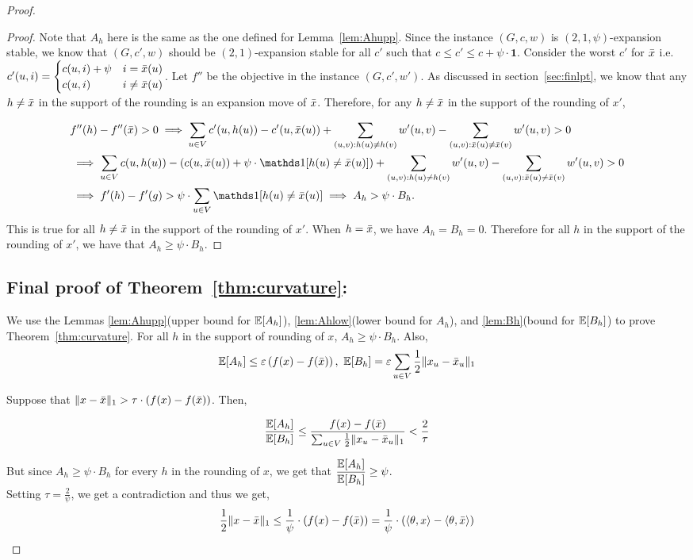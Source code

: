 \begin{proof}
\begin{proof}
Note that $A_h$ here is the same as the one defined for Lemma~\ref{lem:Ahupp}.
Since the instance $(G,c,w)$ is $(2,1,\psi)$-expansion stable, we know that $(G,c',w)$ should be $(2,1)$-expansion stable for all $c'$ such that $c \leq c' \leq c + \psi \cdot \mathbf{1}$. Consider the worst $c'$ for $\bar{x}$ i.e.  $c'(u,i) = \begin{cases}
    c(u,i) + \psi & i = \bar{x}(u)\\
    c(u,i) & i \ne \bar{x}(u)
\end{cases}$. 
Let $f''$ be the objective in the instance $(G,c',w')$. As discussed in section~\ref{sec:finlpt}, we know that any $h \neq \bar{x}$ in the support of the rounding is an expansion move of $\bar{x}$. Therefore, for any $h \neq \bar{x}$ in the support of the rounding of $x'$,

\begin{align*}
    & f''(h) - f''(\bx) > 0 \implies \sum_{u \in V} c'(u,h(u)) - c'(u,\bx(u))  + \sum_{(u,v):h(u)\neq h(v)} w'(u,v) - \sum_{(u,v):\bx(u)\neq \bx(v)} w'(u,v) > 0
    \\&\implies \sum_{u \in V} c(u,h(u)) - \rbr{c(u,\bx(u)) + \psi \cdot \indicator[h(u) \ne \bx(u)] } + \sum_{(u,v):h(u)\neq h(v)} w'(u,v) - \sum_{(u,v):\bx(u)\neq \bx(v)} w'(u,v) > 0
    \\&\implies f'(h) - f'(g) > \psi \cdot \sum_{u \in V} \indicator[h(u) \ne \bx(u)] \implies A_h > \psi \cdot B_h.
\end{align*}
This is true for all $h \neq \bar{x}$ in the support of the rounding of $x'$. When $h = \bar{x}$, we have $A_h = B_h = 0$. Therefore for all $h$ in the support of the rounding of $x'$, we have that $A_h \geq \psi \cdot B_h$.  \end{proof}

\subsection{Final proof of Theorem~\ref{thm:curvature}:}
We use the Lemmas \ref{lem:Ahupp}(upper bound for $\operatorname*{\mathbb{E}}[A_h]$), \ref{lem:Ahlow}(lower bound for $A_h$), and \ref{lem:Bh}(bound for $\operatorname*{\mathbb{E}}[B_h]$) to prove Theorem~\ref{thm:curvature}. For all $h$ in the support of rounding of $x$, $A_h \geq \psi \cdot B_h$. Also, 
\[ \operatorname*{\mathbb{E}}[A_h] \leq \varepsilon \left(f(x) - f(\bar{x})\right),\ \operatorname*{\mathbb{E}}[B_h] = \varepsilon \sum_{u \in V} \frac{1}{2} \lVert x_u - \bar{x}_u \rVert_1  \]

Suppose that $\lVert x - \bar{x} \rVert_1 > \tau \cdot \left(f(x) - f(\bar{x})\right)$. Then,

\[ \frac{\operatorname*{\mathbb{E}}[A_h]}{\operatorname*{\mathbb{E}}[B_h]} \leq \frac{f(x) - f(\bar{x})}{\sum_{u \in V} \frac{1}{2} \lVert x_u - \bar{x}_u \rVert_1} < \frac{2}{\tau} \]

But since $A_h \geq \psi \cdot B_h$ for every $h$ in the rounding of $x$, we get that $\dfrac{\operatorname*{\mathbb{E}}[A_h]}{\operatorname*{\mathbb{E}}[B_h]} \geq \psi$.
\\Setting $\tau = \frac{2}{\psi}$, we get a contradiction and thus we get, \[ \frac{1}{2}\lVert x - \bar{x} \rVert_1 \leq \frac{1}{\psi}\cdot \left(f(x) - f(\bar{x})\right) = \frac{1}{\psi} \cdot \left(\langle \theta,x\rangle-\langle \theta,\bar{x}\rangle\right) \]
\end{proof}


